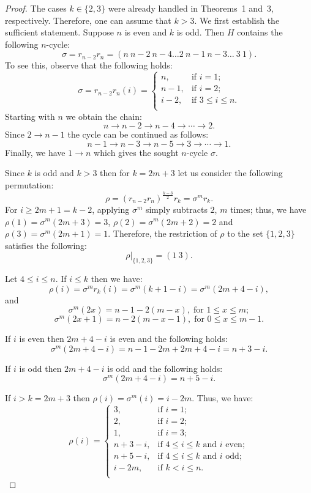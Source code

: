 \documentclass[10pt,a4paper]{amsart}
\theoremstyle{plain}
\theoremstyle{definition}
\begin{document}
\begin{proof} The cases $k \in \{2, 3\}$ were already handled in Theorems~1 and~3, respectively. Therefore, one can assume that $k>3$. We first establish the sufficient statement. Suppose $n$ is even and $k$ is odd. Then $H$ contains the following $n$-cycle:
$$\sigma = r_{n-2}r_{n}=(n\ n-2\ n-4\dots 2\ n-1\ n-3 \dots \ 3 \  1).$$ 
To see this, observe that the following holds:
\[
\sigma=r_{n-2}r_n(i)=
\begin{cases}
	n, & \text{if }i=1;\\
	n-1, & \text{if }i=2;\\
	i-2, & \text{if }3\leqslant i\leqslant n.\\
\end{cases}
\]
Starting with \(n\) we obtain the chain:
\[
n\rightarrow n-2\rightarrow n-4 \rightarrow\cdots\rightarrow 2.
\]
Since \(2\rightarrow n-1\) the cycle can be continued as follows:
\[
n-1\rightarrow n-3\rightarrow n-5\rightarrow 3 \rightarrow\cdots \rightarrow 1.
\]
Finally, we have \(1\rightarrow n\) which gives the sought $n$-cycle $\sigma$.

Since $k$ is odd and $k > 3$ then for $k=2m+3$ let us consider the following permutation:
\[
\rho  = (r_{n-2}r_n)^{\frac{k-3}{2}}r_k = \sigma^{m}r_k.
\] 
For $i \geqslant 2m+1=k-2$, applying $\sigma^{m}$ simply subtracts $2$, $m$ times; thus, we have $\rho(1) = \sigma^{m}(2m + 3) = 3$, $\rho(2) = \sigma^{m}(2m + 2) = 2$ and $\rho(3) = \sigma^{m}(2m + 1) = 1$.
Therefore, the restriction of $\rho$ to the set $\{1,2,3\}$ satisfies the following: $$\rho\vert_{\{1,2,3\}} = (1\ 3).$$

Let $4 \leqslant i \leqslant n$. If $i \leqslant k$ then we have: 
\[
\rho(i) = \sigma^{m}r_k(i) = \sigma^{m}(k+1-i) = \sigma^{m}(2m+4-i),
\]
and
\[
\sigma^{m}(2x) = n-1-2(m-x), \; \text{for } 1 \leqslant x \leqslant m;
\]
\[
\sigma^{m}(2x+1) = n-2(m-x-1), \; \text{for } 0 \leqslant x \leqslant m-1.
\]

If $i$ is even then $2m+4-i$ is even and the following holds:
\[
\sigma^{m}(2m+4-i) = n-1 - 2m + 2m+4-i = n + 3 - i.
\]

If $i$ is odd then $2m+4-i$ is odd and the following holds:
\[
\sigma^{m}(2m+4-i) = n + 5 - i.     
\]

If $i > k = 2m+3$ then $\rho(i) = \sigma^{m}(i) = i - 2m$. Thus, we have:
\[
\rho(i)=
\begin{cases}
	3, & \text{if }i=1;\\
	2, & \text{if }i=2;\\
	1, & \text{if }i=3;\\
	n+3 - i, & \text{if }4\leqslant i\leqslant k \mbox{ and } i \text{ even};\\
	n+5 - i, & \text{if }4\leqslant i\leqslant k \mbox{ and } i \text{ odd};\\
	i - 2m, & \text{if }k < i\leqslant n.\\
\end{cases}
\]


\end{proof}
\end{document}

